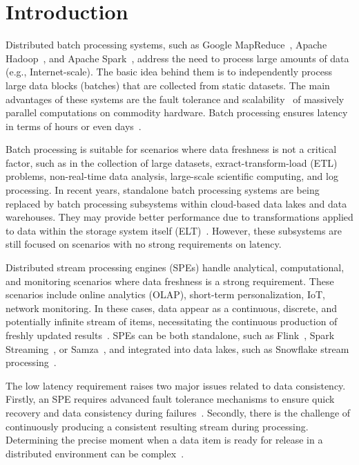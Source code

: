 \chapter{Introduction}

Distributed batch processing systems, such as Google MapReduce~\cite{Dean:2008:MSD:1327452.1327492}, Apache Hadoop~\cite{hadoop2009hadoop}, and Apache Spark~\cite{Zaharia:2016:ASU:3013530.2934664}, address the need to process large amounts of data (e.g., Internet-scale). The basic idea behind them is to independently process large data blocks (batches) that are collected from static datasets. The main advantages of these systems are the fault tolerance and scalability~\cite{borthakur2011apache} of massively parallel computations on commodity hardware. Batch processing ensures latency in terms of hours or even days~\cite{carbone2015apache, chang2014hawq, sun2023survey}. 

Batch processing is suitable for scenarios where data freshness is not a critical factor, such as in the collection of large datasets, exract-transform-load (ETL) problems, non-real-time data analysis, large-scale scientific computing, and log processing. In recent years, standalone batch processing systems are being replaced by batch processing subsystems within cloud-based data lakes and data warehouses. They may provide better performance due to transformations applied to data within the storage system itself (ELT)~\cite{stonebraker2024goes, akidau2024continuous}. However, these subsystems are still focused on scenarios with no strong requirements on latency. 

Distributed stream processing engines (SPEs) handle analytical, computational, and monitoring scenarios where data freshness is a strong requirement. These scenarios include online analytics (OLAP), short-term personalization, IoT, network monitoring. In these cases, data appear as a continuous, discrete, and potentially infinite stream of items, necessitating the continuous production of freshly updated results~\cite{fragkoulis2024survey, diro2024anomaly}. SPEs can be both standalone, such as Flink~\cite{carbone2015apache}, Spark Streaming~\cite{Zaharia:2012:DSE:2342763.2342773}, or Samza~\cite{Noghabi:2017:SSS:3137765.3137770}, and integrated into data lakes, such as Snowflake stream processing~\cite{akidau2024continuous}.

The low latency requirement raises two major issues related to data consistency. Firstly, an SPE requires advanced fault tolerance mechanisms to ensure quick recovery and data consistency during failures~\cite{Wang:2019:LSF:3341301.3359653, akidau2015streaming}. Secondly, there is the challenge of continuously producing a consistent resulting stream during processing. Determining the precise moment when a data item is ready for release in a distributed environment can be complex~\cite{Tucker:2003:EPS:776752.776780, DBLP:journals/pvldb/BegoliACHKKMS21}.

